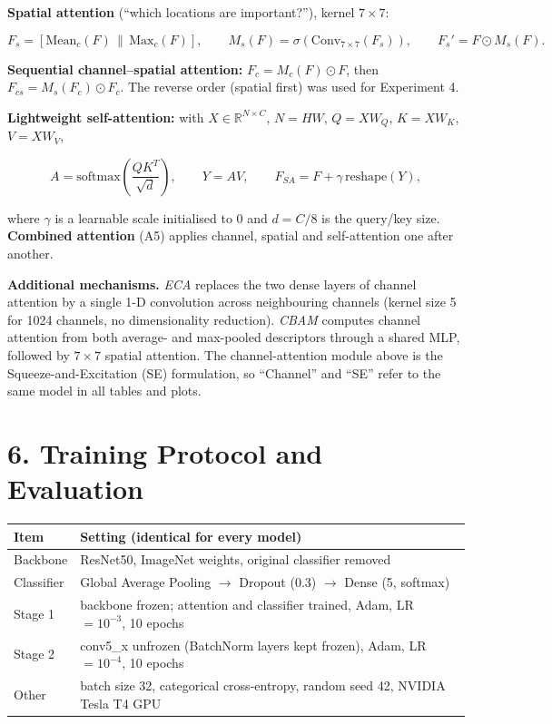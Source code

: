 \documentclass[10pt]{article}
\begin{document}
\textbf{Spatial attention} (``which locations are important?''), kernel $7\times7$:

\[
F_s=[\mathrm{Mean}_c(F)\,\|\,\mathrm{Max}_c(F)],\qquad
M_s(F)=\sigma\left(\mathrm{Conv}_{7\times7}(F_s)\right),\qquad
F_s'=F\odot M_s(F).
\]

\textbf{Sequential channel--spatial attention:}
$F_c=M_c(F)\odot F$, then $F_{cs}=M_s(F_c)\odot F_c$. The reverse order
(spatial first) was used for Experiment 4.

\textbf{Lightweight self-attention:} with $X\in\mathbb{R}^{N\times C}$,
$N=HW$, $Q=XW_Q$, $K=XW_K$, $V=XW_V$,

\[
A=\mathrm{softmax}\!\left(\frac{QK^{T}}{\sqrt{d}}\right),\qquad
Y=AV,\qquad
F_{SA}=F+\gamma\,\mathrm{reshape}(Y),
\]

where $\gamma$ is a learnable scale initialised to 0 and $d=C/8$ is the
query/key size. \textbf{Combined attention} (A5) applies channel, spatial
and self-attention one after another.

\textbf{Additional mechanisms.} \emph{ECA} replaces the two dense layers of
channel attention by a single 1-D convolution across neighbouring channels
(kernel size 5 for 1024 channels, no dimensionality reduction).
\emph{CBAM} computes channel attention from both average- and max-pooled
descriptors through a shared MLP, followed by $7\times7$ spatial attention.
The channel-attention module above is the Squeeze-and-Excitation (SE)
formulation, so ``Channel'' and ``SE'' refer to the same model in all
tables and plots.

\section*{6. Training Protocol and Evaluation}

\begin{center}
\begin{tabular}{|l|p{11.5cm}|}
\hline
Item & Setting (identical for every model)\\
\hline
Backbone & ResNet50, ImageNet weights, original classifier removed\\
Classifier & Global Average Pooling $\rightarrow$ Dropout (0.3) $\rightarrow$ Dense (5, softmax)\\
Stage 1 & backbone frozen; attention and classifier trained, Adam, LR $=10^{-3}$, 10 epochs\\
Stage 2 & conv5\_x unfrozen (BatchNorm layers kept frozen), Adam, LR $=10^{-4}$, 10 epochs\\
Other & batch size 32, categorical cross-entropy, random seed 42, NVIDIA Tesla T4 GPU\\
\hline
\end{tabular}
\end{center}
\end{document}
